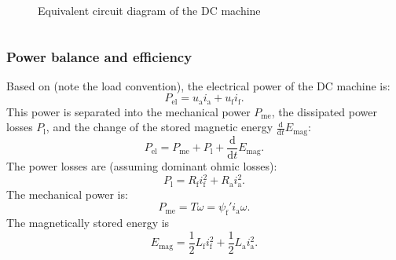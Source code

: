 \begin{frame}
\begin{columns}
\begin{column}{0.45\textwidth}
\begin{figure}
		\caption{Equivalent circuit diagram of the DC machine}
		\label{fig:ECD_DC_machine}
	\end{figure}
\end{column}
\end{columns}
\end{frame}

\begin{frame}
	\frametitle{Power balance and efficiency}
		Based on  (note the load convention), the electrical power of the DC machine is:
		\begin{equation}
			P_\mathrm{el} = u_\mathrm{a} i_\mathrm{a} + u_\mathrm{f} i_\mathrm{f}.
		\end{equation} \pause
		This power is separated into the mechanical power $P_\mathrm{me}$, the dissipated power losses $P_\mathrm{l}$, and the change of the stored magnetic energy $\frac{\mathrm{d}}{\mathrm{d}t}E_\mathrm{mag}$:
		\begin{equation}
			P_\mathrm{el} = P_\mathrm{me} + P_\mathrm{l} + \frac{\mathrm{d}}{\mathrm{d}t}E_\mathrm{mag}.
		\end{equation} \pause
		The power losses are (assuming dominant ohmic losses):
		\begin{equation}
			P_\mathrm{l} = R_\mathrm{f} i_\mathrm{f}^2 + R_\mathrm{a} i_\mathrm{a}^2.
		\end{equation} \pause
		The mechanical power is:
		\begin{equation}
			P_\mathrm{me} = T \omega = \psi_\mathrm{f}' i_\mathrm{a} \omega.
		\end{equation} \pause
		The magnetically stored energy is
		\begin{equation}
			E_\mathrm{mag} = \frac{1}{2} L_\mathrm{f} i_\mathrm{f}^2 + \frac{1}{2} L_\mathrm{a} i_\mathrm{a}^2.
		\end{equation}
\end{frame}

